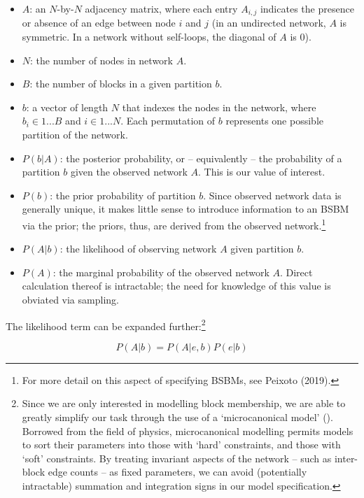 \documentclass[
  12pt,
  a4paper,
  DIV=11,
  numbers=noendperiod,
  twoside,
  open=any]{scrartcl}
\providecommand{\tightlist}{%
  \setlength{\itemsep}{0pt}\setlength{\parskip}{0pt}}\usepackage{longtable,booktabs,array}
\begin{document}
\begin{itemize}
\tightlist
\item
  \(A\): an \(N\)-by-\(N\) adjacency matrix, where each entry
  \(A_{i,j}\) indicates the presence or absence of an edge between node
  \(i\) and \(j\) (in an undirected network, \(A\) is symmetric. In a
  network without self-loops, the diagonal of \(A\) is 0).
\item
  \(N\): the number of nodes in network \(A\).
\item
  \(B\): the number of blocks in a given partition \(b\).
\item
  \(b\): a vector of length \(N\) that indexes the nodes in the network,
  where \(b_i\in{1 ...B}\) and \(i\in{1 ...N}\). Each permutation of
  \(b\) represents one possible partition of the network.
\item
  \(P(b|A)\): the posterior probability, or -- equivalently -- the
  probability of a partition \(b\) given the observed network \(A\).
  This is our value of interest.
\item
  \(P(b)\): the prior probability of partition \(b\). Since observed
  network data is generally unique, it makes little sense to introduce
  information to an BSBM via the prior; the priors, thus, are derived
  from the observed network.\footnote{For more detail on this aspect of
    specifying BSBMs, see Peixoto (2019).}
\item
  \(P(A|b)\): the likelihood of observing network \(A\) given partition
  \(b\).
\item
  \(P(A)\): the marginal probability of the observed network \(A\).
  Direct calculation thereof is intractable; the need for knowledge of
  this value is obviated via sampling.
\end{itemize}

The likelihood term can be expanded further:\footnote{Since we are only
  interested in modelling block membership, we are able to greatly
  simplify our task through the use of a `microcanonical model'
  (). Borrowed from the
  field of physics, microcanonical modelling permits models to sort
  their parameters into those with `hard' constraints, and those with
  `soft' constraints. By treating invariant aspects of the network --
  such as inter-block edge counts -- as fixed parameters, we can avoid
  (potentially intractable) summation and integration signs in our model
  specification.}

\[
P(A|b)=P(A|e,b)P(e|b)
\]
\end{document}
